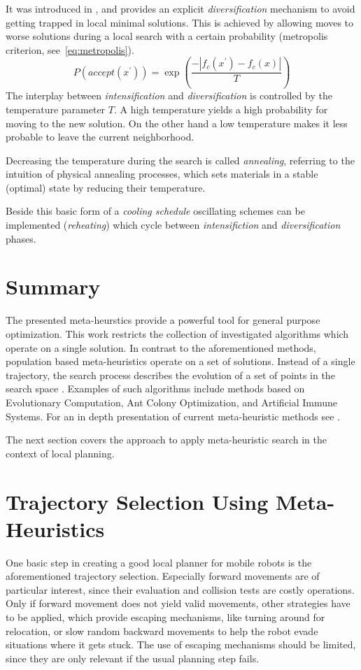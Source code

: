 It was introduced in \cite{Kirkpatrick83SimulatedAnnealing}, and provides an explicit \emph{diversification} mechanism to avoid getting trapped in local minimal solutions. 
This is achieved by allowing moves to worse solutions during a local search with a certain probability (metropolis criterion, see~\ref{eq:metropolis}).
\begin{equation}
   P(accept(x^\prime))=\exp{(\frac{-|f_c(x^\prime)-f_c(x)|}{T})}
   \label{eq:metropolis}
\end{equation} 
The interplay between \emph{intensification} and \emph{diversification} is controlled by the temperature  parameter $T$. A high temperature yields a high probability for moving to the new solution. On the other hand a low temperature makes it less probable to leave the current neighborhood.

Decreasing the temperature during the search is called \emph{annealing}, referring to the intuition of physical annealing processes, which sets materials in a stable (optimal) state by reducing their temperature. 

Beside this basic form of a \emph{cooling schedule} oscillating schemes can be implemented (\emph{reheating}) which cycle between \emph{intensifiction} and \emph{diversification} phases. 

\section{Summary}
The presented meta-heurstics provide a powerful tool for general purpose optimization. 
This work restricts the collection of investigated algorithms which operate on a single solution.
In contrast to the aforementioned methods, population based meta-heuristics operate on a set of solutions. Instead of a single trajectory, the search process describes \grqq the evolution of a set of points in the search space \grqq \cite{blum2003metaheuristics}.  
Examples of such algorithms include methods based on Evolutionary Computation, Ant Colony Optimization, and Artificial Immune Systems.
For an in depth presentation of current meta-heuristic methods see \cite{Gendreau2010}.

The next section covers the approach to apply meta-heuristic search in the context of local planning.

\clearpage
\section{Trajectory Selection Using Meta-Heuristics} \label{sec:trajselmeta}
One basic step in creating a good local planner for mobile robots is the aforementioned trajectory selection. Especially forward movements are of particular interest, since their evaluation and collision tests are costly operations.
Only if forward movement does not yield valid movements, other strategies have to be applied, which provide escaping mechanisms, like turning around for relocation, or slow random backward movements to help the robot evade situations where it gets stuck. 
The use of escaping mechanisms should be limited, since they are only relevant if the usual planning step fails. 

